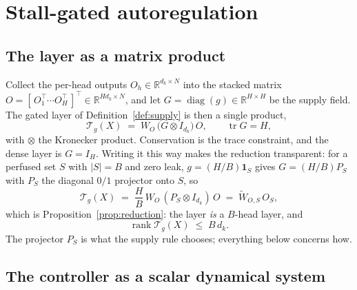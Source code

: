 
\section{Stall-gated autoregulation}

\subsection{The layer as a matrix product}

Collect the per-head outputs $O_h \in \mathbb{R}^{d_k \times N}$ into the stacked matrix
$O = [\,O_1^{\top} \cdots O_H^{\top}\,]^{\top} \in \mathbb{R}^{H d_k \times N}$, and let
$G = \operatorname{diag}(g) \in \mathbb{R}^{H \times H}$ be the supply field. The gated
layer of Definition~\ref{def:supply} is then a single product,
\begin{equation}
  \label{eq:kron}
  \mathcal{T}_g(X) \;=\; W_O \,\bigl( G \otimes I_{d_k} \bigr)\, O,
  \qquad \operatorname{tr} G = H,
\end{equation}
with $\otimes$ the Kronecker product. Conservation is the trace constraint, and the
dense layer is $G = I_H$. Writing it this way makes the reduction transparent: for a
perfused set $S$ with $|S| = B$ and zero leak, $g = (H/B)\mathbf{1}_S$ gives
$G = (H/B) P_S$ with $P_S$ the diagonal $0/1$ projector onto $S$, so
\begin{equation}
  \mathcal{T}_g(X)
  \;=\; \frac{H}{B}\, W_O \,(P_S \otimes I_{d_k})\, O
  \;=\; \widetilde{W}_{O,S}\, O_S ,
\end{equation}
which is Proposition~\ref{prop:reduction}: the layer \emph{is} a $B$-head layer, and
\begin{equation}
  \operatorname{rank} \mathcal{T}_g(X) \;\le\; B \, d_k .
\end{equation}
The projector $P_S$ is what the supply rule chooses; everything below concerns how.

\subsection{The controller as a scalar dynamical system}

